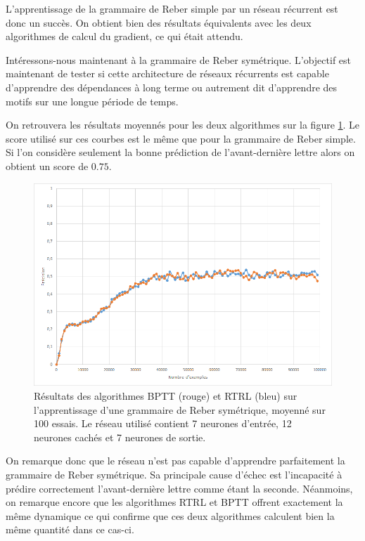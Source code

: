 L'apprentissage de la grammaire de Reber simple par un réseau récurrent est donc un succès. On obtient bien des résultats équivalents avec les deux algorithmes de calcul du gradient, ce qui était attendu.

\medbreak

Intéressons-nous maintenant à la grammaire de Reber symétrique. L'objectif est maintenant de tester si cette architecture de réseaux récurrents est capable d'apprendre des dépendances à long terme ou autrement dit d'apprendre des motifs sur une longue période de temps.

On retrouvera les résultats moyennés pour les deux algorithmes sur la figure \ref{curves_reber_double}. Le score utilisé sur ces courbes est le même que pour la grammaire de Reber simple. Si l'on considère seulement la bonne prédiction de l'avant-dernière lettre alors on obtient un score de $0.75$.

\begin{figure}[h!]
\begin{center}
\includegraphics[scale=0.4]{images/chapter5/rtrl_bptt.png}
\caption{Résultats des algorithmes BPTT (rouge) et RTRL (bleu) sur l'apprentissage d'une grammaire de Reber symétrique, moyenné sur 100 essais. Le réseau utilisé contient 7 neurones d'entrée, 12 neurones cachés et 7 neurones de sortie.}
\label{curves_reber_double}
\end{center}
\end{figure}

On remarque donc que le réseau n'est pas capable d'apprendre parfaitement la grammaire de Reber symétrique. Sa principale cause d'échec est l'incapacité à prédire correctement l'avant-dernière lettre comme étant la seconde. Néanmoins, on remarque encore que les algorithmes RTRL et BPTT offrent exactement la même dynamique ce qui confirme que ces deux algorithmes calculent bien la même quantité dans ce cas-ci.

